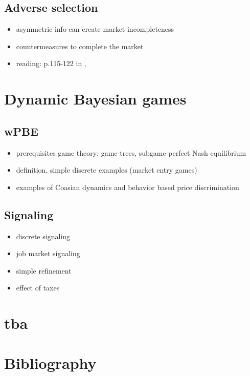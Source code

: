 \documentclass[11pt]{article}
\begin{document}
\subsection{Adverse selection}
\label{sec:org6f541f9}
\begin{itemize}
\item asymmetric info can create market incompleteness
\item countermeasures to complete the market
\item reading:  p.115-122 in \cite{einav2011selection}, \cite{Ake70}
\end{itemize}
\section{Dynamic Bayesian games}
\label{sec:orgbf28085}
\subsection{wPBE}
\label{sec:orgf9b7d48}
\begin{itemize}
\item prerequisites game theory: game trees, subgame perfect Nash equilibrium
\item definition, simple discrete examples (market entry games)
\item examples of Coasian dynamics and behavior based price discrimination
\end{itemize}

\subsection{Signaling}
\label{sec:orgb8c0ef4}
\begin{itemize}
\item discrete signaling
\item job market signaling
\item simple refinement
\item effect of taxes
\end{itemize}

\section{tba}
\label{sec:org5834885}

\section{Bibliography}
\label{sec:org74536fa}


\end{document}
